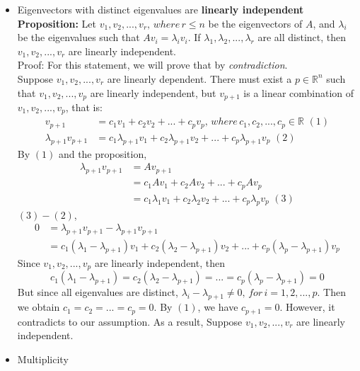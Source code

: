 \documentclass[11pt]{article}
\begin{document}
\begin{itemize}
	\item Eigenvectors with distinct eigenvalues are \textbf{linearly independent}\\
	\textbf{Proposition:} Let $v_1, v_2, ..., v_r,\, where\, r \leqslant n$ be the eigenvectors of $A$, and  $\lambda_i$ be the eigenvalues such that $Av_i = \lambda_i v_i$. If $\lambda _1, \lambda _2, ...,\lambda _r$ are all distinct, then $v_1, v_2, ..., v_r$ are linearly independent.\\
	Proof: For this statement, we will prove that by \textit{contradiction}.\\
	Suppose $v_1, v_2, ..., v_r$ are linearly dependent. There must exist a $p \in \mathbb{R}^n$ such that $v_1, v_2, ..., v_p$ are linearly independent, but $v_{p+1}$ is a linear combination of $v_1, v_2, ..., v_p$, that is:
	\begin{align*}
	v_{p+1}&=c_1 v_1 + c_2 v_2 +...+ c_p v_p,\, where\, c_1, c_2,..., c_p \in \mathbb{R}\,\, (1)\\
	\lambda _{p+1} v_{p+1} &= c_1 \lambda _{p+1} v_1 + c_2 \lambda _{p+1} v_2 +...+ c_p \lambda _{p+1} v_p \,\, (2)
	\end{align*}
	By $(1)$ and the proposition, 
	\begin{align*}
	\lambda _{p+1} v_{p+1} &= Av_{p+1}\\
	&= c_1 A v_1 + c_2 A v_2 +...+ c_p A v_p\\
	&= c_1 \lambda_1 v_1 + c_2 \lambda_2 v_2 +...+ c_p \lambda_p v_p \,\, (3)
	\end{align*}
	$(3)-(2)$,
	\begin{align*}
	0&=\lambda _{p+1} v_{p+1}- \lambda _{p+1} v_{p+1}\\
	&=c_1 (\lambda_1 -\lambda _{p+1}) v_1 + c_2 (\lambda_2 -\lambda _{p+1}) v_2 +...+ c_p (\lambda_p -\lambda _{p+1}) v_p
	\end{align*}
	Since $v_1, v_2, ..., v_p$ are linearly independent, then
	$$c_1 (\lambda_1 -\lambda _{p+1})=c_2 (\lambda_2 -\lambda _{p+1})=...=c_p (\lambda_p -\lambda _{p+1})=0$$
	But since all eigenvalues are distinct, $\lambda _i - \lambda _{p+1} \neq 0, \, for\, i=1,2,...,p.$ Then we obtain $c_1=c_2=...=c_p=0$. By $(1)$, we have $c_{p+1} =0$. However, it contradicts to our assumption. As a result, Suppose $v_1, v_2, ..., v_r$ are linearly independent.
	
	\item Multiplicity
\end{itemize}

\newpage
\end{document}
